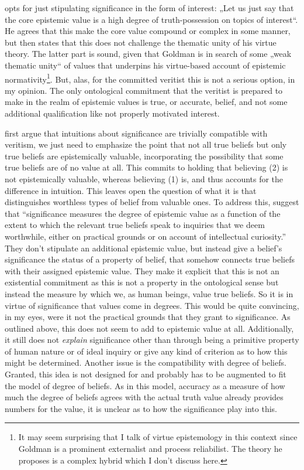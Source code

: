 \documentclass[12pt,numbers=noenddot]{scrartcl}
\begin{document}
\textcite[61]{Goldman2002-GOLTUO-2} opts for just stipulating significance in the form of interest: „Let us just say that the core epistemic value is a high degree of truth-possession on topics of interest“. He agrees that this make the core value compound or complex in some manner, but then states that this does not challenge the thematic unity of his virtue theory. The latter part is sound, given that Goldman is in search of some „weak thematic unity“ of values that underpins his virtue-based account of epistemic normativity\footnote{It may seem surprising that I talk of virtue epistemology in this context since Goldman is a prominent externalist and process reliabilist. The theory he proposes is a complex hybrid which I don't discuss here.}. But, alas, for the committed veritist this is not a serious option, in my opinion. The only ontological commitment that the veritist is prepared to make in the realm of epistemic values is true, or accurate, belief, and not some additional qualification like not properly motivated interest.

\textcite[332]{Ahlstrom-Vij2013} first argue that intuitions about significance are trivially compatible with veritism, we just need to emphasize the point that not all true beliefs but only true beliefs are epistemically valuable, incorporating the possibility that some true beliefs are of no value at all. This commits to holding that believing (2) is not epistemically valuable, whereas believing (1) is, and thus accounts for the difference in intuition. This leaves open the question of what it is that distinguishes worthless types of belief from valuable ones. To address this, \textcite[334]{Ahlstrom-Vij2013} suggest that “significance measures the degree of epistemic value as a function of the extent to which the relevant true beliefs speak to inquiries that we deem worthwhile, either on practical grounds or on account of intellectual curiosity.” They don't stipulate an additional epistemic value, but instead give a belief's significance the status of a property of belief, that somehow connects true beliefs with their assigned epistemic value. They make it explicit that this is not an existential commitment as this is not a property in the ontological sense but instead the measure by which we, as human beings, value true beliefs. So it is in virtue of significance that values come in degrees. This would be quite convincing, in my eyes, were it not the practical grounds that they grant to significance. As outlined above, this does not seem to add to epistemic value at all. Additionally, it still does not \emph{explain} significance other than through being a primitive property of human nature or of ideal inquiry or give any kind of criterion as to how this might be determined. Another issue is the compatibility with degree of beliefs. Granted, this idea is not designed for and probably has to be augmented to fit the model of degree of beliefs. As in this model, accuracy as a measure of how much the degree of beliefs agrees with the actual truth value already provides numbers for the value, it is unclear as to how the significance play into this.
\end{document}
